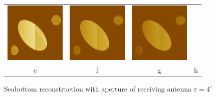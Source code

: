 \documentclass{procDDs}
\begin{document}
\begin{figure}[h!]
\begin{tabular}{cccc}
		\includegraphics[width=0.2\linewidth]{k-img-7-7.jpg}&
		\includegraphics[width=0.2\linewidth]{k-img-7-8.jpg}&
		\includegraphics[width=0.2\linewidth]{k-img-7-9.jpg}\\
		e & f & g & h
	\end{tabular}
	\caption{Seabottom reconstruction with aperture of receiving antenna $\varepsilon=4^\circ$}
	\label{ris:desc3}
\end{figure}
\end{document}
